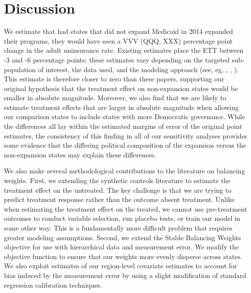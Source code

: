 \documentclass[12pt]{article}
\begin{document}
\section{Discussion}

We estimate that had states that did not expand Medicaid in 2014 expanded their programs, they would have seen a VVV (QQQ, XXX) percentage point change in the adult uninsurance rate. Existing estimates place the ETT between -3 and -6 percentage points; these estimates vary depending on the targeted sub-population of interest, the data used, and the modeling approach (see, eg, \cite{courtemanche2017early}, \cite{kaestner2017effects}, \cite{frean2017premium}). This estimate is therefore closer to zero than these  papers, supporting our original hypothesis that the treatment effect on non-expansion states would be smaller in absolute magnitude. Moreover, we also find that we are likely to estimate treatment effects that are larger in absolute magnitude when allowing our comparison states to include states with more Democratic governance. While the differences all lay within the estimated margins of error of the original point estimates, the consistency of this finding in all of our sensitivity analyses provides some evidence that the differing political composition of the expansion versus the non-expansion states may explain these differences. 

We also make several methodological contributions to the literature on balancing weights. First, we extending the synthetic controls literature to estimate the treatment effect on the untreated. The key challenge is that we are trying to predict treatment response rather than the outcome absent treatment. Unlike when estimating the treatment effect on the treated, we cannot use pre-treatment outcomes to conduct variable selection, run placebo tests, or train our model in some other way. This is a fundamentally more difficult problem that requires greater modeling assumptions. Second, we extend the Stable Balancing Weights objective for use with hierarchical data and measurement error. We modify the objective function to ensure that our weights more evenly disperse across states. We also exploit estimates of our region-level covariate estimates to account for bias induced by the measurement error by using a slight modification of standard regression calibration techniques.
\end{document}

